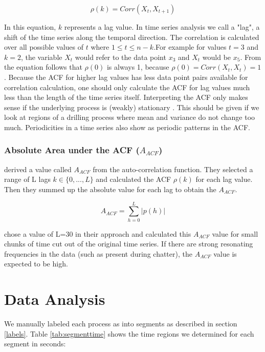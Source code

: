 \documentclass[12 pt]{scrartcl}
\begin{document}
\[ \rho(k) = Corr(X_t, X_{t+1}) \]

In this equation, $k$ represents a lag value. In time series analysis we call a "lag", a shift of the time series along the temporal direction. The correlation is calculated over all possible values of $t$ where $1 \le t \le n - k$.For example for values $t = 3$ and $k = 2$, the variable $X_t$ would refer to the data point $x_3$ and $X_t$ would be $x_5$. From the equation follows that $\rho(0)$ is always 1, because $\rho(0) = Corr(X_t, X_t) = 1$. Because the ACF for higher lag values has less data point pairs available for correlation calculation, one should only calculate the ACF for lag values much less than the length of the time series itself.
Interpreting the ACF only makes sense if the underlying process is (weakly) stationary \citep[p.~4]{deistler2022time}. This should be given if we look at regions of a drilling process where mean and variance do not change too much. Periodicities in a time series also show as periodic patterns in the ACF.

\subsubsection{Absolute Area under the ACF ($A_{ACF}$)}

\citet{weinert2001statistics} derived a value called $A_{ACF}$ from the auto-correlation function. They selected a range of L lags $k \in \{0, ..., L\}$ and calculated the ACF $\rho(k)$ for each lag value. Then they summed up the absolute value for each lag to obtain the $A_{ACF}$.

\[ A_{ACF} = \sum^{L}_{h=0}{|p(h)|} \]

\citet{weinert2001statistics} chose a value of L=30 in their approach and calculated this $A_{ACF}$ value for small chunks of time cut out of the original time series. If there are strong resonating frequencies in the data (such as present during chatter), the $A_{ACF}$ value is expected to be high.

\section{Data Analysis}

We manually labeled each process as into segments as described in section \ref{labels}. Table \ref{tab:segmenttime} shows the time regions we determined for each segment in seconds:
\end{document}
